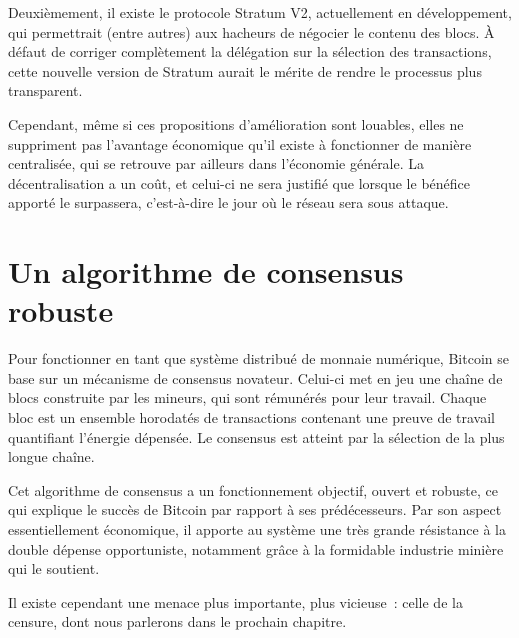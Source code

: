 Deuxièmement, il existe le protocole Stratum V2, actuellement en développement, qui permettrait (entre autres) aux hacheurs de négocier le contenu des blocs. À défaut de corriger complètement la délégation sur la sélection des transactions, cette nouvelle version de Stratum aurait le mérite de rendre le processus plus transparent.

Cependant, même si ces propositions d'amélioration sont louables, elles ne suppriment pas l'avantage économique qu'il existe à fonctionner de manière centralisée, qui se retrouve par ailleurs dans l'économie générale. La décentralisation a un coût, et celui-ci ne sera justifié que lorsque le bénéfice apporté le surpassera, c'est-à-dire le jour où le réseau sera sous attaque.

\section*{Un algorithme de consensus robuste}

Pour fonctionner en tant que système distribué de monnaie numérique, Bitcoin se base sur un mécanisme de consensus novateur. Celui-ci met en jeu une chaîne de blocs construite par les mineurs, qui sont rémunérés pour leur travail. Chaque bloc est un ensemble horodatés de transactions contenant une preuve de travail quantifiant l'énergie dépensée. Le consensus est atteint par la sélection de la plus longue chaîne.

Cet algorithme de consensus a un fonctionnement objectif, ouvert et robuste, ce qui explique le succès de Bitcoin par rapport à ses prédécesseurs. Par son aspect essentiellement économique, il apporte au système une très grande résistance à la double dépense opportuniste, notamment grâce à la formidable industrie minière qui le soutient.

Il existe cependant une menace plus importante, plus vicieuse~: celle de la censure, dont nous parlerons dans le prochain chapitre.

\printendnotes
